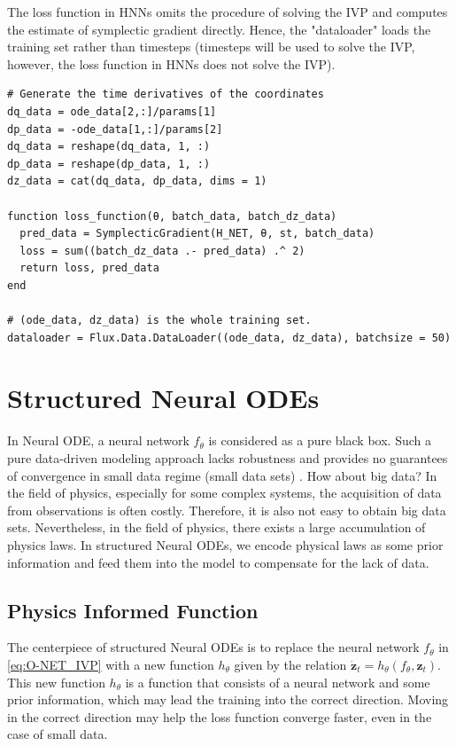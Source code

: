 \documentclass[
	parskip, 			   %
	twoside, 			   %
	DIV=14, 			   %
	BCOR=15.0mm, 		   %
	headsepline, 		   %
	open=right, 		   %
	captions=tableheading, %
	bibliography=totoc,    %
	numbers=noenddot       %
]{scrreprt}
\begin{document}
The loss function in HNNs omits the procedure of solving the IVP and computes the estimate of symplectic gradient directly. Hence, the "dataloader" loads the training set rather than timesteps (timesteps will be used to solve the IVP, however, the loss function in HNNs does not solve the IVP).

\begin{verbatim}
# Generate the time derivatives of the coordinates
dq_data = ode_data[2,:]/params[1]
dp_data = -ode_data[1,:]/params[2]
dq_data = reshape(dq_data, 1, :)
dp_data = reshape(dp_data, 1, :)
dz_data = cat(dq_data, dp_data, dims = 1)

function loss_function(θ, batch_data, batch_dz_data)
  pred_data = SymplecticGradient(H_NET, θ, st, batch_data)
  loss = sum((batch_dz_data .- pred_data) .^ 2)
  return loss, pred_data
end

# (ode_data, dz_data) is the whole training set.
dataloader = Flux.Data.DataLoader((ode_data, dz_data), batchsize = 50)
\end{verbatim}

\section{Structured Neural ODEs}
In Neural ODE, a neural network $f_{\theta}$ is considered as a pure black box. Such a pure data-driven modeling approach lacks robustness and provides no guarantees of convergence in small data regime (small data sets) \cite{raissi2017physics}. How about big data? In the field of physics, especially for some complex systems, the acquisition of data from observations is often costly. Therefore, it is also not easy to obtain big data sets. Nevertheless, in the field of physics, there exists a large accumulation of physics laws. In structured Neural ODEs, we encode physical laws as some prior information and feed them into the model to compensate for the lack of data.

\subsection{Physics Informed Function}

The centerpiece of structured Neural ODEs is to replace the neural network $f_{\theta}$ in \ref{eq:O-NET_IVP} with a new function $h_{\theta}$ given by the relation $\dot{\mathbf{z}}_t = h_{\theta}(f_{\theta}, \mathbf{z}_t)$. This new function $h_{\theta}$ is a function that consists of a neural network and some prior information, which may lead the training into the correct direction. Moving in the correct direction may help the loss function converge faster, even in the case of small data.
\end{document}
